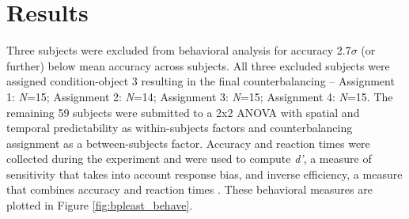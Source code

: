 \documentclass[dwyatte_dissertation.tex]{subfiles}
\begin{document}
\section{Results}
Three subjects were excluded from behavioral analysis for accuracy 2.7$\sigma$ (or further) below mean accuracy across subjects. All three excluded subjects were assigned condition-object 3 resulting in the final counterbalancing -- Assignment 1: \textit{N}=15; Assignment 2: \textit{N}=14; Assignment 3: \textit{N}=15; Assignment 4: \textit{N}=15. The remaining 59 subjects were submitted to a 2x2 ANOVA with spatial and temporal predictability as within-subjects factors and counterbalancing assignment as a between-subjects factor. Accuracy and reaction times were collected during the experiment and were used to compute \textit{d'}, a measure of sensitivity that takes into account response bias, and inverse efficiency, a measure that combines accuracy and reaction times \cite{TownshendAshby78,TownshendAshby83}. These behavioral measures are plotted in Figure \ref{fig:bpleast_behave}.
\end{document}
